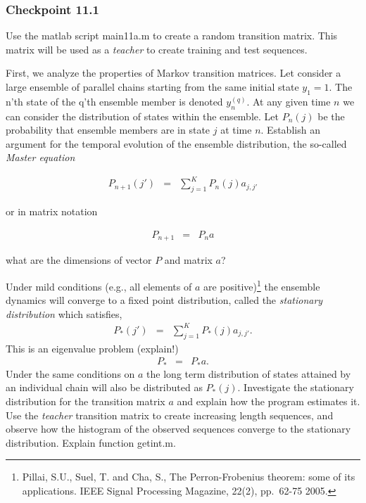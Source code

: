 \documentclass[A4,12pt]{article}    %
\begin{document}
\subsubsection*{Checkpoint 11.1}

Use the matlab script {\sf main11a.m} to create a random transition matrix. This matrix will be used as a {\it teacher} to create training and test sequences.

First, we  analyze the properties of Markov transition matrices. Let consider a large ensemble of parallel chains starting from the same initial state $y_1 = 1$. The n'th state of the q'th ensemble member is denoted $y^{(q)}_n$. At any given time $n$ we can consider the distribution of states within the ensemble. Let $P_n(j)$ be the probability that ensemble members are in state $j$ at time $n$. Establish an argument for the temporal evolution of the ensemble distribution, the so-called \emph{Master equation}

\begin{eqnarray}
P_{n+1}(j') & =& \sum_{j = 1}^K P_n(j) a _{j,j'} \nonumber
\end{eqnarray}

or in  matrix notation

\begin{eqnarray}
P_{n+1} & =& P_n a \nonumber
\end{eqnarray}

what are the dimensions of vector $P$ and matrix $a$?

Under mild conditions (e.g., all elements of $a$ are positive)\footnote{Pillai, S.U., Suel, T. and Cha, S., The Perron-Frobenius theorem: some of its applications. IEEE Signal Processing Magazine, 22(2), pp.\ 62-75 2005.} the ensemble dynamics will converge to a fixed point distribution, called the {\it stationary distribution} which satisfies,
\begin{eqnarray}
P_{\ast}(j') & =& \sum_{j = 1}^K P_{\ast}(j)a _{j,j'}. \nonumber
\end{eqnarray}
This is an eigenvalue problem (explain!)
\begin{eqnarray}
P_{\ast} & =& P_{\ast} a. \nonumber
\end{eqnarray}
Under the same conditions on $a$ the long term distribution of states attained by an individual chain will also be distributed as $P_{\ast}(j)$. Investigate  the   stationary distribution for the transition matrix $a$ and explain how the program estimates it.
Use the \emph{teacher} transition matrix to create increasing length sequences, and observe how the histogram of the observed sequences converge
to the stationary distribution. Explain function {\sf getint.m}.
\end{document}
